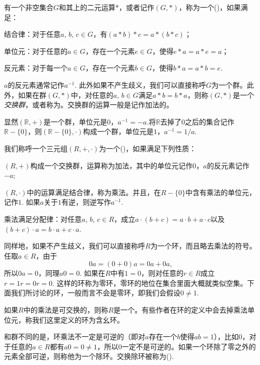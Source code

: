 \begin{para}[群]
有一个非空集合$G$和其上的二元运算$*$，或者记作$(G,*)$，称为一个()，如果满足：

\begin{compactenum}[~~(1)]
\item 结合律：对于任意$a$, $b$, $c\in G$，有$(a*b)*c=a*(b*c)$；
\item 单位元：对于任意的$a\in G$，存在一个元素$e\in G$，使得$e*a=a*e=a$；
\item 反元素：对于每一个$a\in G$，存在一个元素$b\in G$，使得$b*a=a*b=e$.
\end{compactenum}

$a$的反元素通常记作$a^{-1}$. 此外如果不产生歧义，我们可以直接称呼$G$为一个群。此外，如果在群$(G,*)$中，对任意的$a$, $b\in G$满足$a*b=b*a$，则称$(G,*)$是一个\textit{交换群}，或者称为。交换群的运算一般是记作加法的。
\end{para}

显然$(\mathbb{R},+)$是一个群，单位元是$0$，$a^{-1}=-a$.将$\mathbb{R}$去掉了$0$之后的集合记作$\mathbb{R}-\{0\}$，则$(\mathbb{R}-\{0\},\cdot)$构成一个群，单位元是$1$，$a^{-1}=1/a$.

\begin{para}[环]
我们称呼一个三元组$(R,+,\cdot)$为一个()，如果满足下列性质：

\begin{compactenum}[~~(1)]
\item $(R,+)$构成一个交换群，运算称为加法，其中的单位元记作$0$，$a$的反元素记作$-a$;
\item $(R,\cdot)$中的运算满足结合律，称为乘法。并且，在$R-\{0\}$中含有乘法的单位元，记作$1$. 如果$a$关于$1$有逆，则逆写作$a^{-1}$.
\item 乘法满足分配律：对任意$a$, $b$, $c \in R$，成立$a\cdot(b+c)=a\cdot b+a\cdot c$以及$(b+c)\cdot a=b\cdot a+c\cdot a$.
\end{compactenum}

同样地，如果不产生歧义，我们可以直接称呼$R$为一个环，而且略去乘法的符号。任取$a\in R$，由于
\[
	0a=(0+0)a=0a+0a,
\]
所以$0a=0$，同理$a0=0$. 如果在$R$中有$1=0$，则对任意的$r\in R$成立$r=1r=0r=0$. 这样的环称为零环，零环的地位在集合里面大概就类似空集。下面我们所讨论的环，一般而言不会是零环，即我们会假设$0\neq 1$.

如果$R$中的乘法是可交换的，则称$R$是一个。有些作者在环的定义中会去掉乘法单位元，称我们这里定义的环为含幺环。

和群不同的是，环乘法不一定是可逆的（即对$a$存在一个$b$使得$ab=1$），比如$0$，对于任意的$a\in R$都有$a0=0\neq 1$，所以$0$一定不是可逆的。如果一个环除了零之外的元素全部可逆，则称他为一个除环。交换除环被称为().
\end{para}

